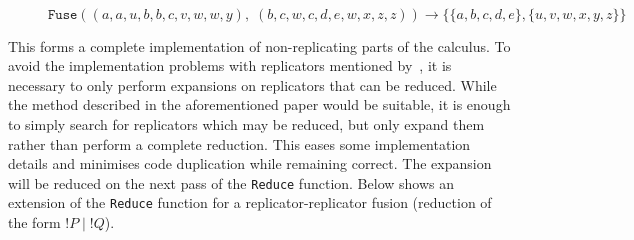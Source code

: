 \begin{examples}{~\\}
\begin{figure}[H]
                \caption*{$\texttt{Fuse}((a, a, u, b, b, c, v, w, w, y), \; (b, c, w, c, d, e, w, x, z, z)) \rightarrow \{\{a, b, c, d, e\}, \{u, v, w, x, y, z\}\}$}
            \end{figure}
        \end{examples}

        This forms a complete implementation of non-replicating parts of the calculus.
        To avoid the implementation problems with replicators mentioned by~\cite{solo-diagrams}, it is necessary to only perform expansions on replicators that can be reduced.
        While the method described in the aforementioned paper would be suitable, it is enough to simply search for replicators which may be reduced, but only expand them rather than perform a complete reduction.
        This eases some implementation details and minimises code duplication while remaining correct.
        The expansion will be reduced on the next pass of the \texttt{Reduce} function.
        Below shows an extension of the \texttt{Reduce} function for a replicator-replicator fusion (reduction of the form $!P \;|\; !Q$).

